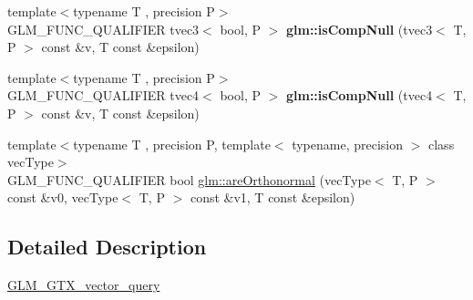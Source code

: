 \begin{DoxyCompactItemize}
\item 
\mbox{\label{vector__query_8inl_a5972ae9ce1c88fcd539f51a218af865f}} 
{\footnotesize template$<$typename T , precision P$>$ }\\G\+L\+M\+\_\+\+F\+U\+N\+C\+\_\+\+Q\+U\+A\+L\+I\+F\+I\+ER tvec3$<$ bool, P $>$ {\bfseries glm\+::is\+Comp\+Null} (tvec3$<$ T, P $>$ const \&v, T const \&epsilon)
\item 
\mbox{\label{vector__query_8inl_ac4b73e500deea02815aa386fe10296c8}} 
{\footnotesize template$<$typename T , precision P$>$ }\\G\+L\+M\+\_\+\+F\+U\+N\+C\+\_\+\+Q\+U\+A\+L\+I\+F\+I\+ER tvec4$<$ bool, P $>$ {\bfseries glm\+::is\+Comp\+Null} (tvec4$<$ T, P $>$ const \&v, T const \&epsilon)
\item 
{\footnotesize template$<$typename T , precision P, template$<$ typename, precision $>$ class vec\+Type$>$ }\\G\+L\+M\+\_\+\+F\+U\+N\+C\+\_\+\+Q\+U\+A\+L\+I\+F\+I\+ER bool \hyperlink{group__gtx__vector__query_ga89c82bc60e5b84e4489b74c15a134caf}{glm\+::are\+Orthonormal} (vec\+Type$<$ T, P $>$ const \&v0, vec\+Type$<$ T, P $>$ const \&v1, T const \&epsilon)
\end{DoxyCompactItemize}


\subsection{Detailed Description}
\hyperlink{group__gtx__vector__query}{G\+L\+M\+\_\+\+G\+T\+X\+\_\+vector\+\_\+query} 